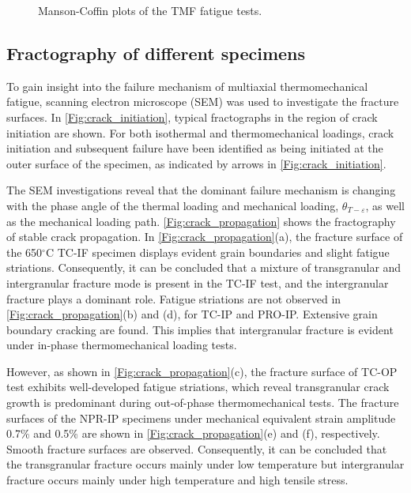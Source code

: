 \begin{figure}[!htp]
  \caption{Manson-Coffin plots of the TMF fatigue tests.}
  \label{Fig:plot_exp_fatigue_life}
\end{figure}

\subsection{Fractography of different specimens}
\noindent
To gain insight into the failure mechanism of multiaxial thermomechanical fatigue, scanning electron microscope (SEM) was used to investigate the fracture surfaces. In \ref{Fig:crack_initiation}, typical fractographs in the region of crack initiation are shown. For both isothermal and thermomechanical loadings, crack initiation and subsequent failure have been identified as being initiated at the outer surface of the specimen, as indicated by arrows in \ref{Fig:crack_initiation}.

The SEM investigations reveal that the dominant failure mechanism is changing with the phase angle of the thermal loading and mechanical loading, $\theta_{T-\varepsilon}$, as well as the mechanical loading path.
\ref{Fig:crack_propagation} shows the fractography of stable crack propagation.
In \ref{Fig:crack_propagation}(a), the fracture surface of the 650$^\circ$C TC-IF specimen displays evident grain boundaries and slight fatigue striations. Consequently, it can be concluded that a mixture of transgranular and intergranular fracture mode is present in the TC-IF test, and the intergranular fracture plays a dominant role.
Fatigue striations are not observed in \ref{Fig:crack_propagation}(b) and (d), for TC-IP and PRO-IP. Extensive grain boundary cracking are found. This implies that intergranular fracture is evident under in-phase thermomechanical loading tests.

However, as shown in \ref{Fig:crack_propagation}(c), the fracture surface of TC-OP test exhibits well-developed fatigue striations, which reveal transgranular crack growth is predominant during out-of-phase thermomechanical tests.
The fracture surfaces of the NPR-IP specimens under mechanical equivalent strain amplitude 0.7\% and 0.5\% are shown in \ref{Fig:crack_propagation}(e) and (f), respectively. Smooth fracture surfaces are observed.
Consequently, it can be concluded that the transgranular fracture occurs mainly under low temperature but intergranular fracture occurs mainly under high temperature and high tensile stress.

